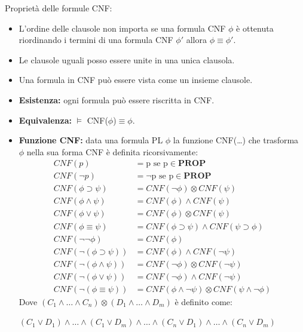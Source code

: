 \documentclass[../main.tex]{subfiles}
\begin{document}
    Proprietà delle formule CNF:
    \begin{itemize}
        \item L'ordine delle clausole non importa se una formula CNF $\phi$ è ottenuta riordinando i termini di una formula CNF $\phi \prime$ allora $\phi \equiv \phi \prime$.
        \item Le clausole uguali posso essere unite in una unica clausola.
        \item Una formula in CNF può essere vista come un insieme clausole.
        \item \textbf{Esistenza:} ogni formula può essere riscritta in CNF.
        \item \textbf{Equivalenza:} $\models$ CNF($\phi$)$\equiv \phi$.
        \item \textbf{Funzione CNF:} data una formula PL $\phi$ la funzione CNF(\dots) che trasforma $\phi$ nella sua forma CNF è definita ricorsivamente:
            \begin{align*}
                CNF(p)&=\text{p se p} \in \textbf{PROP}\\
                CNF(\lnot p) &=\text{$\lnot$p se p} \in \textbf{PROP}\\
                CNF(\phi \supset \psi) &= CNF(\lnot \phi) \otimes CNF(\psi)\\
                CNF(\phi \land \psi) &= CNF(\phi) \land CNF(\psi)\\
                CNF(\phi \lor \psi) &= CNF(\phi) \otimes CNF(\psi)\\
                CNF(\phi \equiv \psi) &= CNF(\phi \supset \psi) \land CNF(\psi \supset \phi)\\
                CNF(\lnot \lnot \phi) &= CNF(\phi)\\
                CNF(\lnot (\phi \supset \psi)) &= CNF(\phi) \land CNF(\lnot \psi)\\
                CNF(\lnot (\phi \land \psi)) &= CNF(\lnot \phi) \otimes CNF(\lnot \psi)\\
                CNF(\lnot (\phi \lor \psi)) &= CNF(\lnot \phi) \land CNF(\lnot \psi)\\
                CNF(\lnot (\phi \equiv \psi)) &= CNF(\phi \land \lnot \psi) \otimes CNF(\psi \land \lnot \phi)
            \end{align*}
            Dove $(C_1 \land \dots \land C_n) \otimes (D_1 \land \dots \land D_m)$ è definito come:
            \begin{center}
                $(C_1 \lor D_1) \land \dots \land(C_1 \lor D_m) \land \dots \land(C_n \lor D_1) \land \dots \land(C_n \lor D_m)$
            \end{center}
    \end{itemize}
\end{document}
